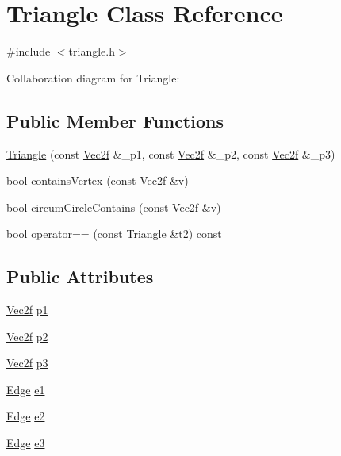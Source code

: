 \hypertarget{class_triangle}{}\section{Triangle Class Reference}
\label{class_triangle}


{\ttfamily \#include $<$triangle.\+h$>$}



Collaboration diagram for Triangle\+:
\subsection*{Public Member Functions}
\begin{DoxyCompactItemize}
\item 
\hyperlink{class_triangle_ac91f2225feea061bdc8b90b5ad05ab42}{Triangle} (const \hyperlink{class_vec2f}{Vec2f} \&\+\_\+p1, const \hyperlink{class_vec2f}{Vec2f} \&\+\_\+p2, const \hyperlink{class_vec2f}{Vec2f} \&\+\_\+p3)
\item 
bool \hyperlink{class_triangle_a8b279a0dff36453b04b359dc1c3dfb50}{contains\+Vertex} (const \hyperlink{class_vec2f}{Vec2f} \&v)
\item 
bool \hyperlink{class_triangle_a7a46dcbaa3532abb09c561ae79a3cc77}{circum\+Circle\+Contains} (const \hyperlink{class_vec2f}{Vec2f} \&v)
\item 
bool \hyperlink{class_triangle_a12315ef4973d7f56ca51760330391e05}{operator==} (const \hyperlink{class_triangle}{Triangle} \&t2) const 
\end{DoxyCompactItemize}
\subsection*{Public Attributes}
\begin{DoxyCompactItemize}
\item 
\hyperlink{class_vec2f}{Vec2f} \hyperlink{class_triangle_af2ff757f1bff3177e1a0e8c19664edbc}{p1}
\item 
\hyperlink{class_vec2f}{Vec2f} \hyperlink{class_triangle_a6a7d000238fb26c47181de1e7a502037}{p2}
\item 
\hyperlink{class_vec2f}{Vec2f} \hyperlink{class_triangle_a43b6750934c84aff2f34b38d2f26d012}{p3}
\item 
\hyperlink{class_edge}{Edge} \hyperlink{class_triangle_ab91aa48d8a4c25deecd1a35433a38260}{e1}
\item 
\hyperlink{class_edge}{Edge} \hyperlink{class_triangle_a5ad4339f6fb03adb4f6ee840ace34d82}{e2}
\item 
\hyperlink{class_edge}{Edge} \hyperlink{class_triangle_aa55fc8f8662cba36b227858760bb173c}{e3}
\end{DoxyCompactItemize}
